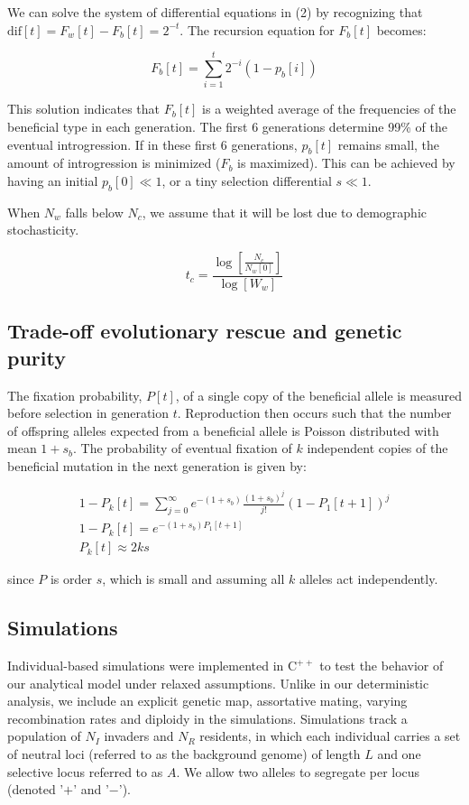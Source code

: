 \documentclass[a4paper,10pt]{article}
\begin{document}
We can solve the system of differential equations in (2) by recognizing that $\text{dif}[t]=F_w[t]-F_b[t] = 2^{-t}$. The recursion equation for $F_b[t]$ becomes:

\begin{equation}
    F_b[t] = \sum_{i=1}^t 2^{-i} (1-p_b[i])
\end{equation}

This solution indicates that $F_b[t]$ is a weighted average of the frequencies of the beneficial type in each generation. The first 6 generations determine 99\% of the eventual introgression. If in these first 6 generations, $p_b[t]$ remains small, the amount of introgression is minimized ($F_b$ is maximized). This can be achieved by having an initial $p_b[0] \ll 1$, or a tiny selection differential $s \ll 1$.

When $N_w$ falls below $N_{c}$, we assume that it will be lost due to demographic stochasticity. 

\begin{equation}
    t_c = \frac{\log [\frac{N_c}{N_w[0]}]}{\log [W_w]}
\end{equation}



\subsection*{Trade-off evolutionary rescue and genetic purity}

The fixation probability, $P[t]$, of a single copy of the beneficial allele is measured before selection in generation $t$. Reproduction then occurs such that the number of offspring alleles expected from a beneficial allele is Poisson distributed with mean $1+s_b$. The probability of eventual fixation of $k$ independent copies of the beneficial mutation in the next generation is given by:

\begin{equation}
\begin{array}{l}
1-P_k[t]=\sum_{j=0}^{\infty} e^{-(1+s_b)}\frac{(1+s_b)^j}{j!}(1-P_1[t+1])^j\\
1-P_k[t]=e^{-(1+s_b)P_1[t+1]}\\
P_k[t]\approx 2 k s
\end{array}
\end{equation}

since $P$ is order $s$, which is small and assuming all $k$ alleles act independently.

\subsection*{Simulations}
Individual-based simulations were implemented in $\text{C}^{++}$ to test the behavior of our analytical model under relaxed assumptions. Unlike in our deterministic analysis, we include an explicit genetic map, assortative mating, varying recombination rates and diploidy in the simulations. Simulations track a population of $N_I$ invaders and $N_R$ residents, in which each individual carries a set of neutral loci (referred to as the background genome) of length $L$ and one selective locus referred to as $A$. We allow two alleles to segregate per locus (denoted '$+$' and '$-$'). 
	
\end{document}
